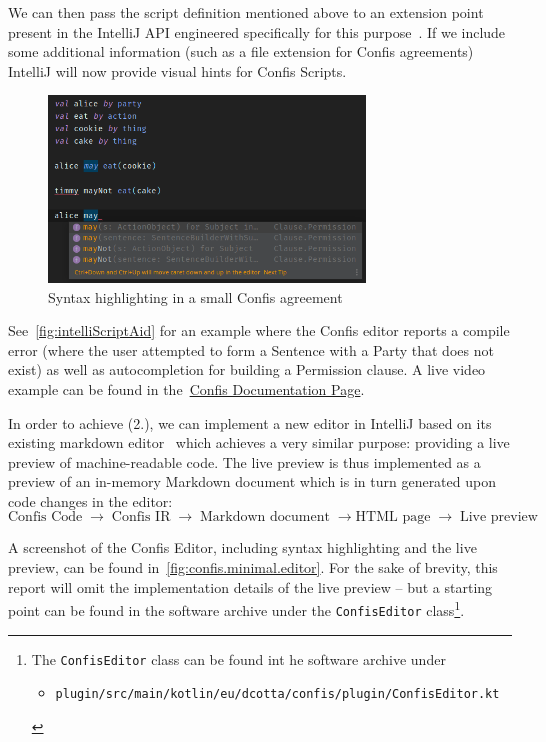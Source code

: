 We can then pass the script definition mentioned above to an extension point present in the IntelliJ API engineered specifically for this purpose~\cite{ideaExtensionPoints, intelliJRepo}.
If we include some additional information (such as a file extension for Confis agreements) IntelliJ will now provide visual hints for Confis Scripts.

\begin{figure}[h]
    \centering
    \includegraphics[width=0.75\textwidth]{figures/minimal.editor.highlighting.confis}
    \caption{Syntax highlighting in a small Confis agreement}
    \label{fig:intelliScriptAid}
\end{figure}

See~\autoref{fig:intelliScriptAid} for an example where the Confis editor reports a compile error (where the user attempted to form a Sentence with a Party that does not exist) as well as autocompletion for building a Permission clause.
A live video example can be found in the~\href{https://confis.dcotta.eu/0.1.1/IDE%20Support/IDEAPlugin/}{Confis Documentation Page}.

In order to achieve (2.), we can implement a new editor in IntelliJ based on its existing markdown editor~\cite{ideaMarkdownPreview} which achieves a very similar purpose: providing a live preview of machine-readable code.
The live preview is thus implemented as a preview of an in-memory Markdown document which is in turn generated upon code changes in the editor:
\begin{equation*}
    \text{Confis Code}\; \to\; \text{Confis IR}\; \to\; \text{Markdown document}\; \to \text{HTML page}\; \to\; \text{Live preview}
\end{equation*}

A screenshot of the Confis Editor, including syntax highlighting and the live preview, can be found in~\autoref{fig:confis.minimal.editor}.
For the sake of brevity, this report will omit the implementation details of the live preview -- but a starting point can be found in the software archive under the \texttt{ConfisEditor} class\footnote{
    The \texttt{ConfisEditor} class can be found int he software archive under
    \begin{itemize}
        \item \texttt{plugin/src/main/kotlin/eu/dcotta/confis/plugin/ConfisEditor.kt}
    \end{itemize}\vspace{-8mm}
}.

